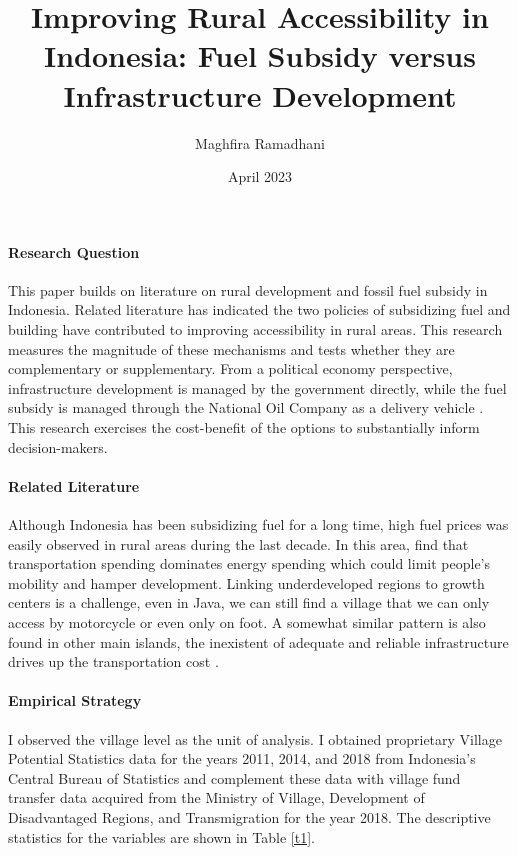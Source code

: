 \documentclass[letterpaper,11pt,leqno]{article}
\begin{document}
\title{Improving Rural Accessibility in Indonesia: Fuel Subsidy versus Infrastructure Development}
\author{Maghfira Ramadhani}
\date{April 2023}       
\maketitle
 
\paragraph{Research Question} This paper builds on literature on rural development and fossil fuel subsidy in Indonesia. Related literature has indicated the two policies of subsidizing fuel and building have contributed to improving accessibility in rural areas. This research measures the magnitude of these mechanisms and tests whether they are complementary or supplementary. From a political economy perspective, infrastructure development is managed by the government directly, while the fuel subsidy is managed through the National Oil Company as a delivery vehicle \citep{ichsan_2022}. This research exercises the cost-benefit of the options to substantially inform decision-makers.

\paragraph{Related Literature} Although Indonesia has been subsidizing fuel for a long time, high fuel prices was easily observed in rural areas during the last decade. In this area, \citet{sambodo_2019} find that transportation spending dominates energy spending which could limit people's mobility and hamper development. Linking underdeveloped regions to growth centers is a challenge, even in Java, we can still find a village that we can only access by motorcycle or even only on foot. A somewhat similar pattern is also found in other main islands, the inexistent of adequate and reliable infrastructure drives up the transportation cost \citep{sandee_2016}.


\paragraph{Empirical Strategy} I observed the village level as the unit of analysis. I obtained proprietary Village Potential Statistics data for the years 2011, 2014, and 2018 from Indonesia's Central Bureau of Statistics and complement these data with village fund transfer data acquired from the Ministry of Village, Development of Disadvantaged Regions, and Transmigration for the year 2018. The descriptive statistics for the variables are shown in Table \ref{t1}.
\end{document}
